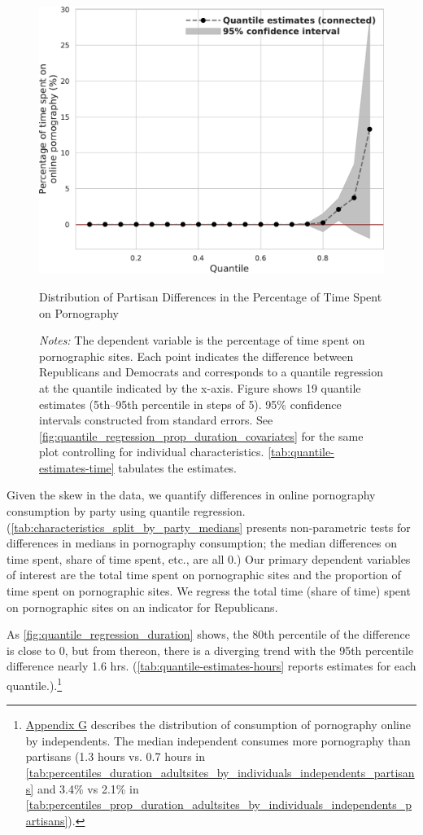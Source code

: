 \documentclass[12pt,twoside]{article}
\begin{document}
\begin{figure}[t]
	\centering
	\includegraphics[width=.7\linewidth]{figs/quantile_reg_proportion_duration_adult.pdf}
	\caption{Distribution of Partisan Differences in the Percentage of Time Spent on Pornography}
	\caption*{\footnotesize \emph{Notes:} 
	The dependent variable is the percentage of time spent on pornographic sites. Each point indicates the difference between Republicans and Democrats and corresponds to a quantile regression at the quantile indicated by the x-axis. Figure shows 19 quantile estimates (5th--95th percentile in steps of 5).
		95\% confidence intervals constructed from standard errors.
		See \cref{fig:quantile_regression_prop_duration_covariates} for the same plot controlling for individual characteristics.
            \cref{tab:quantile-estimates-time} tabulates the estimates.
	}
	\label{fig:quantile_regression_prop_duration}
\end{figure}

Given the skew in the data, we quantify differences in online pornography consumption by party using quantile regression. (\cref{tab:characteristics_split_by_party_medians} presents non-parametric tests for differences in medians in pornography consumption; the median differences on time spent, share of time spent, etc., are all 0.) Our primary dependent variables of interest are the total time spent on pornographic sites and the proportion of time spent on pornographic sites. We regress the total time (share of time) spent on pornographic sites on an indicator for Republicans.

As \cref{fig:quantile_regression_duration} shows, the 80th percentile of the difference is close to 0, but from thereon, there is a diverging trend with the 95th percentile difference nearly 1.6 hrs. (\cref{tab:quantile-estimates-hours} reports estimates for each quantile.).\footnote{\hyperref[sm:smG]{Appendix G} describes the distribution of consumption of pornography online by independents. The median independent consumes more pornography than partisans (1.3 hours vs. 0.7 hours in \cref{tab:percentiles_duration_adultsites_by_individuals_independents_partisans} and 3.4\% vs 2.1\% in \cref{tab:percentiles_prop_duration_adultsites_by_individuals_independents_partisans}).}
\end{document}
